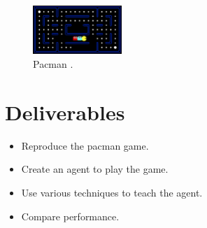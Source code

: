 \begin{figure}
\centering
\includegraphics[width=0.3\textwidth]{pacman2.png}
\caption{\label{fig:pacman}Pacman \cite{teaching}.}
\end{figure}



\section{Deliverables}
\begin{itemize}
\item Reproduce the pacman game.
\item Create an agent to play the game.
\item Use various techniques to teach the agent.
\item Compare performance. \cite{*}
\end{itemize}





